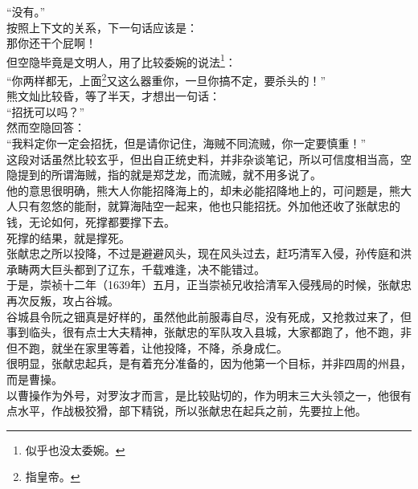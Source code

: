 \begin{multicols}{\theparacolNo}
“没有。”\\

按照上下文的关系，下一句话应该是：\\

那你还干个屁啊！\\

但空隐毕竟是文明人，用了比较委婉的说法\footnote{似乎也没太委婉。}：\\

“你两样都无，上面\footnote{指皇帝。}又这么器重你，一旦你搞不定，要杀头的！”\\

熊文灿比较昏，等了半天，才想出一句话：\\

“招抚可以吗？”\\

然而空隐回答：\\

“我料定你一定会招抚，但是请你记住，海贼不同流贼，你一定要慎重！”\\

这段对话虽然比较玄乎，但出自正统史料，并非杂谈笔记，所以可信度相当高，空隐提到的所谓海贼，指的就是郑芝龙，而流贼，就不用多说了。\\

他的意思很明确，熊大人你能招降海上的，却未必能招降地上的，可问题是，熊大人只有忽悠的能耐，就算海陆空一起来，他也只能招抚。外加他还收了张献忠的钱，无论如何，死撑都要撑下去。\\

死撑的结果，就是撑死。\\

张献忠之所以投降，不过是避避风头，现在风头过去，赶巧清军入侵，孙传庭和洪承畴两大巨头都到了辽东，千载难逢，决不能错过。\\

于是，崇祯十二年（1639年）五月，正当崇祯兄收拾清军入侵残局的时候，张献忠再次反叛，攻占谷城。\\

谷城县令阮之钿真是好样的，虽然他此前服毒自尽，没有死成，又抢救过来了，但事到临头，很有点士大夫精神，张献忠的军队攻入县城，大家都跑了，他不跑，非但不跑，就坐在家里等着，让他投降，不降，杀身成仁。\\

很明显，张献忠起兵，是有着充分准备的，因为他第一个目标，并非四周的州县，而是曹操。\\

以曹操作为外号，对罗汝才而言，是比较贴切的，作为明末三大头领之一，他很有点水平，作战极狡猾，部下精锐，所以张献忠在起兵之前，先要拉上他。\\


\end{multicols}
